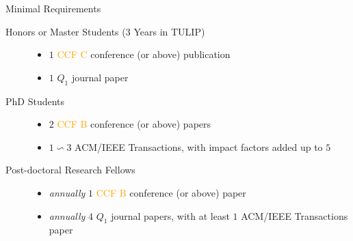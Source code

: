 \documentclass[
 size=14pt,
 paper=smartboard,  %
 mode=present, 		%
 display=slides, 	%
 style=tuliplab,  	%
 pauseslide,
 fleqn,leqno]{powerdot}{}
\begin{document}
%
%


\begin{slide}{Minimal Requirements}
\begin{description}
\item[Honors or Master Students ($3$ Years in TULIP)]
    \begin{itemize}
        \item $1$ \textcolor{orange}{CCF C} conference (or above) publication
        \item $1$ $Q_1$ journal paper
    \end{itemize}
    
\item[PhD Students]
    \begin{itemize}
        \item $2$ \textcolor{orange}{CCF B} conference (or above) papers
        \item $1 \backsim 3$ ACM/IEEE Transactions, 
        with impact factors added up to $5$
    \end{itemize}

\item[Post-doctoral Research Fellows]
    \begin{itemize}
    \item \textit{annually} $1$ \textcolor{orange}{CCF B} conference (or above) paper
    \item \textit{annually} $4$ $Q_1$ journal papers, 
     with at least $1$ ACM/IEEE Transactions paper
    \end{itemize}
    
\end{description}
\end{slide}
\end{document}
